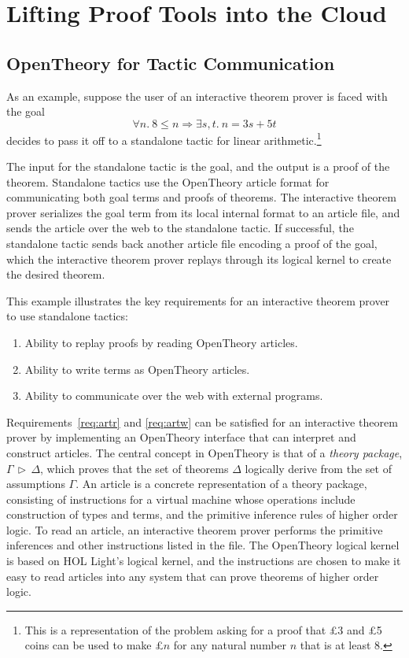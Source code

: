 \documentclass{llncs}
\newcommand{\OpenTheory}{OpenTheory\xspace}
\newcommand{\theory}[2]{{#1}\,\triangleright\,{#2}}
\begin{document}
\section{Lifting Proof Tools into the Cloud}
\label{sec:implementation}

\subsection{\OpenTheory for Tactic Communication}

As an example, suppose the user of an interactive theorem prover is faced with the goal
\[
\forall n.\ 8\le n\Rightarrow\exists s,t.\ n = 3s + 5t
\]
decides to pass it off to a standalone tactic for linear arithmetic.\footnote{This is a representation of the problem asking for a proof that \pounds 3 and \pounds 5 coins can be used to make \pounds $n$ for any natural number $n$ that is at least 8.}

The input for the standalone tactic is the goal, and the output is a proof of the theorem.  Standalone tactics use the \OpenTheory article format for communicating both goal terms and proofs of theorems.  The interactive theorem prover serializes the goal term from its local internal format to an article file, and sends the article over the web to the standalone tactic. If successful, the standalone tactic sends back another article file encoding a proof of the goal, which the interactive theorem prover replays through its logical kernel to create the desired theorem.

This example illustrates the key requirements for an interactive theorem prover to use standalone tactics:
\begin{enumerate}
\item\label{req:artr} Ability to replay proofs by reading \OpenTheory articles.

\item\label{req:artw} Ability to write terms as \OpenTheory articles.

\item\label{req:comm} Ability to communicate over the web with external programs.
\end{enumerate}

Requirements~\ref{req:artr} and \ref{req:artw} can be satisfied for an interactive theorem prover by implementing an \OpenTheory interface that can interpret and construct articles.
The central concept in \OpenTheory is that of a \emph{theory package}, $\theory{\Gamma}{\Delta}$, which proves that the set of theorems $\Delta$ logically derive from the set of assumptions $\Gamma$.
An article is a concrete representation of a theory package, consisting of instructions for a virtual machine whose operations include construction of types and terms, and the primitive inference rules of higher order logic.
To read an article, an interactive theorem prover performs the primitive inferences and other instructions listed in the file.
The \OpenTheory logical kernel is based on HOL Light's logical kernel, and the instructions are chosen to make it easy to read articles into any system that can prove theorems of higher order logic.
\end{document}
